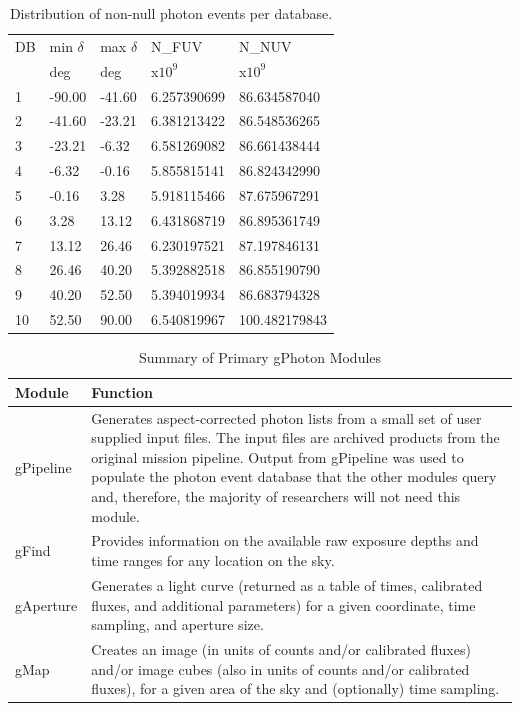 \documentclass[preprint]{aastex}
\begin{document}
\clearpage

\begin{table}
\begin{tabularx}{.47\textwidth}{lllll}
\hline\hline
DB & min $\delta$ & max $\delta$ & N\_FUV & N\_NUV\\
   & deg          & deg          & x$10^9$ & x$10^9$\\
\hline
1 & -90.00 & -41.60 &   6.257390699 &  86.634587040\\
2 & -41.60 & -23.21 &   6.381213422 &  86.548536265\\
3 & -23.21 &  -6.32 &   6.581269082 &  86.661438444\\
4 &  -6.32 &  -0.16 &   5.855815141 &  86.824342990\\
5 &  -0.16 &   3.28 &   5.918115466 &  87.675967291\\
6 &   3.28 &  13.12 &   6.431868719 &  86.895361749\\
7 &  13.12 &  26.46 &   6.230197521 &  87.197846131\\
8 &  26.46 &  40.20 &   5.392882518 &  86.855190790\\
9 &  40.20 &  52.50 &   5.394019934 &  86.683794328\\
10 &  52.50 &  90.00 &   6.540819967 & 100.482179843\\
\hline
\end{tabularx}
\caption{Distribution of non-null photon events per database.\label{dbcounts}}
\end{table}


\begin{table}
\begin{tabular}{|p{2cm}|p{6cm}|}
\hline
	{\bf Module} & {\bf Function}\\\hline
	gPipeline & Generates aspect-corrected photon lists from a small set of user supplied input files. The input files are archived products from the original mission pipeline. Output from gPipeline was used to populate the photon event database that the other modules query and, therefore, the majority of researchers will not need this module.\\\hline
	gFind & Provides information on the available raw exposure depths and time ranges for any location on the sky.\\\hline
	gAperture & Generates a light curve (returned as a table of times, calibrated fluxes, and additional parameters) for a given coordinate, time sampling, and aperture size.\\\hline
	gMap & Creates an image (in units of counts and/or calibrated fluxes) and/or image cubes (also in units of counts and/or calibrated fluxes), for a given area of the sky and (optionally) time sampling.\\
\hline
\end{tabular}
\caption{Summary of Primary gPhoton Modules}
\label{moduledesc}
\end{table}
\end{document}
